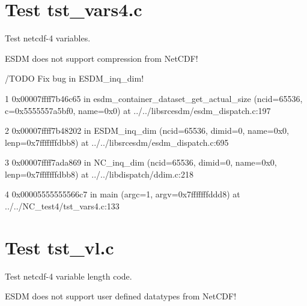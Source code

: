 \section{Test tst\_vars4.c}

Test netcdf-4 variables.

ESDM does not support compression from NetCDF!

/TODO Fix bug in ESDM\_inq\_dim!

1  0x00007ffff7b46c65 in esdm\_container\_dataset\_get\_actual\_size (ncid=65536, c=0x5555557a5bf0, name=0x0) at ../../libsrcesdm/esdm\_dispatch.c:197

2  0x00007ffff7b48202 in ESDM\_inq\_dim (ncid=65536, dimid=0, name=0x0, lenp=0x7fffffffdbb8) at ../../libsrcesdm/esdm\_dispatch.c:695

3  0x00007ffff7ada869 in NC\_inq\_dim (ncid=65536, dimid=0, name=0x0, lenp=0x7fffffffdbb8) at ../../libdispatch/ddim.c:218

4  0x00005555555566c7 in main (argc=1, argv=0x7fffffffddd8) at ../../NC\_test4/tst\_vars4.c:133

\section{Test tst\_vl.c}

Test netcdf-4 variable length code.

ESDM does not support user defined datatypes from NetCDF!

\clearpage

